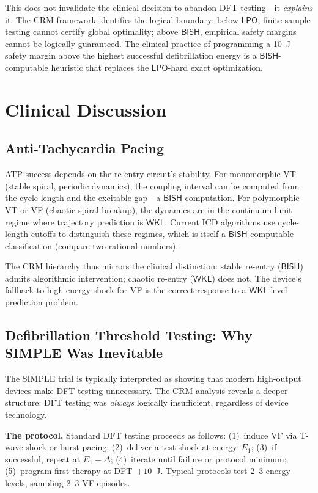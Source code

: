\documentclass[11pt,a4paper]{article}
\theoremstyle{plain}
\theoremstyle{definition}
\newcommand{\BISH}{\textsf{BISH}}
\newcommand{\WKL}{\textsf{WKL}}
\newcommand{\LPO}{\textsf{LPO}}
\begin{document}
This does not invalidate the clinical decision to abandon DFT testing---it \emph{explains} it.  The CRM framework identifies the logical boundary: below $\LPO$, finite-sample testing cannot certify global optimality; above $\BISH$, empirical safety margins cannot be logically guaranteed.  The clinical practice of programming a 10~J safety margin above the highest successful defibrillation energy is a $\BISH$-computable heuristic that replaces the $\LPO$-hard exact optimization.

\section{Clinical Discussion}\label{sec:clinical}

\subsection{Anti-Tachycardia Pacing}

ATP success depends on the re-entry circuit's stability.  For monomorphic VT (stable spiral, periodic dynamics), the coupling interval can be computed from the cycle length and the excitable gap---a $\BISH$ computation.  For polymorphic VT or VF (chaotic spiral breakup), the dynamics are in the continuum-limit regime where trajectory prediction is $\WKL$.  Current ICD algorithms use cycle-length cutoffs to distinguish these regimes, which is itself a $\BISH$-computable classification (compare two rational numbers).

The CRM hierarchy thus mirrors the clinical distinction: stable re-entry ($\BISH$) admits algorithmic intervention; chaotic re-entry ($\WKL$) does not.  The device's fallback to high-energy shock for VF is the correct response to a $\WKL$-level prediction problem.

\subsection{Defibrillation Threshold Testing: Why SIMPLE Was Inevitable}

The SIMPLE trial \cite{simple2013} is typically interpreted as showing that modern high-output devices make DFT testing unnecessary.  The CRM analysis reveals a deeper structure: DFT testing was \emph{always} logically insufficient, regardless of device technology.

\textbf{The protocol.}  Standard DFT testing proceeds as follows: (1)~induce VF via T-wave shock or burst pacing; (2)~deliver a test shock at energy~$E_1$; (3)~if successful, repeat at $E_1 - \Delta$; (4)~iterate until failure or protocol minimum; (5)~program first therapy at DFT~$+ 10$~J.  Typical protocols test 2--3 energy levels, sampling 2--3 VF episodes.
\end{document}
